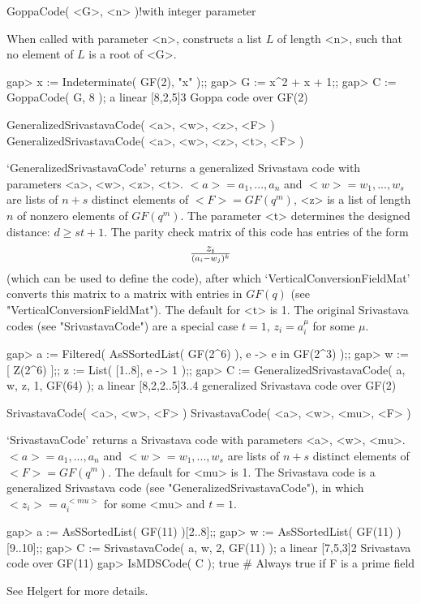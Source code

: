 \>GoppaCode( <G>, <n> )!{with integer parameter}

When called with parameter <n>, {\GUAVA}  constructs a list $L$ of length
<n>, such that no element of $L$ is a root of <G>.

\beginexample
gap> x := Indeterminate( GF(2), "x" );; 
gap> G := x^2 + x + 1;;
gap> C := GoppaCode( G, 8 );
a linear [8,2,5]3 Goppa code over GF(2) 
\endexample

\>GeneralizedSrivastavaCode( <a>, <w>, <z>, <F> )
\>GeneralizedSrivastavaCode( <a>, <w>, <z>, <t>, <F> )

`GeneralizedSrivastavaCode' returns   a generalized Srivastava  code with
parameters <a>, <w>, <z>, <t>. $<a> = a_1, ..., a_n$ and $<w> = w_1, ...,
w_s$ are lists of $n+s$ distinct elements of $<F>=GF(q^m)$, <z> is a list
of length $n$  of   nonzero elements  of  $GF(q^m)$. The   parameter  <t>
determines the designed  distance: $d  \geq  st + 1$.  The parity check
matrix of this code has entries  of the form $$z_i  \over {(a_i - w_j)^k}
$$  (which can be used to define the code), after which
`VerticalConversionFieldMat'  converts this matrix  to  a matrix with
entries in  $GF(q)$  (see "VerticalConversionFieldMat").  The default for
<t> is  1.  The original Srivastava codes  (see  "SrivastavaCode") are  a
special case $t=1$, $z_i=a_i^\mu$ for some $\mu$.

\beginexample
gap> a := Filtered( AsSSortedList( GF(2^6) ), e -> e in GF(2^3) );;
gap> w := [ Z(2^6) ];; z := List( [1..8], e -> 1 );;
gap> C := GeneralizedSrivastavaCode( a, w, z, 1, GF(64) );
a linear [8,2,2..5]3..4 generalized Srivastava code over GF(2) 
\endexample

\>SrivastavaCode( <a>, <w>, <F> )
\>SrivastavaCode( <a>, <w>, <mu>, <F> )

`SrivastavaCode' returns a    Srivastava code with parameters  <a>,  <w>,
<mu>. $<a> = a_1, ..., a_n$ and $<w> = w_1,  ..., w_s$ are lists of $n+s$
distinct elements   of  $<F>=GF(q^m)$. The default  for  <mu>   is 1. The
Srivastava  code      is      a generalized    Srivastava     code   (see
"GeneralizedSrivastavaCode"), in which $<z_i> = a_i^{<mu>}$ for some <mu>
and $t=1$.

\beginexample
gap> a := AsSSortedList( GF(11) ){[2..8]};;
gap> w := AsSSortedList( GF(11) ){[9..10]};;
gap> C := SrivastavaCode( a, w, 2, GF(11) );
a linear [7,5,3]2 Srivastava code over GF(11)
gap> IsMDSCode( C );
true    # Always true if F is a prime field 
\endexample

See Helgert \cite{He72} for more details.


